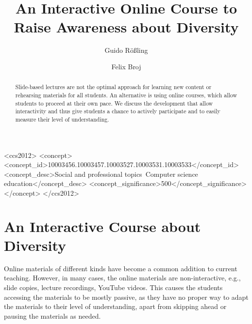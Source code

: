 \documentclass[sigconf]{acmart}
\begin{document}

\title{An Interactive Online Course to Raise Awareness about Diversity}

\author{Guido R\"o\ss{}ling}
\author{Felix Broj}
\begin{CCSXML}
<ccs2012>
<concept>
<concept_id>10003456.10003457.10003527.10003531.10003533</concept_id>
<concept_desc>Social and professional topics~Computer science education</concept_desc>
<concept_significance>500</concept_significance>
</concept>
</ccs2012>
\end{CCSXML}


\begin{abstract}
Slide-based lectures are not the optimal approach for learning new content or rehearsing materials for
all students. An alternative is using online courses, which allow students to proceed at their own pace.
We discuss the development  that allow interactivity and thus give students a chance to
actively participate and to easily measure their level of understanding. 
\end{abstract}

\maketitle

\section{An Interactive Course about Diversity}

Online materials of different kinds have become a common addition to current teaching. However, in
many cases, the online materials are non-interactive, e.g., slide copies, lecture recordings, YouTube
videos. This causes the students accessing the materials to be mostly passive, as they have no
proper way to adapt the materials to their level of understanding, apart from skipping ahead or pausing
the materials as needed.
\end{document}

